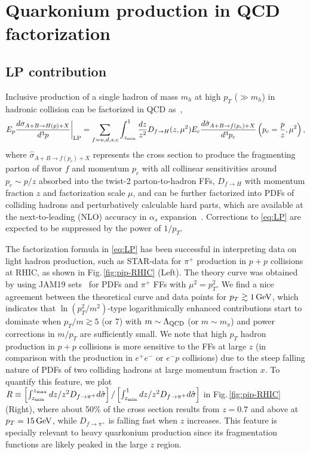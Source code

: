 \documentclass[Physsubmission, Phys]{SciPost}
\begin{document}
\section{Quarkonium production in QCD factorization}
\label{sec:qcd-factorization}


\subsection{LP contribution}
\label{subsec:LP}

Inclusive production of a single hadron of mass $m_h$ at high $p_T$ ($\gg m_h$) in hadronic collision can be factorized in QCD as~\cite{Nayak:2005rt},
\begin{align}
E_p\frac{d\sigma_{A+B\to H(p)+X}}{d^3p}\bigg|_{\rm LP}
= \sum_{f=u,d,s,c}\int_{z_{\rm min}}^1 \frac{dz}{z^2}D_{f\to H}(z,\mu^2)
E_c\frac{d\hat{\sigma}_{A+B\to f(p_c)+X}}{d^3p_c}\left(p_c=\frac{p}{z},\mu^2\right),
\label{eq:LP}
\end{align}
where $\hat{\sigma}_{A+B\to f(p_c)+X}$ represents the cross section to produce the fragmenting parton of flavor $f$ and momentum $p_c$ with all collinear sensitivities around $p_c\sim p/z$  absorbed into the twist-2 parton-to-hadron FFs, $D_{f\to H}$ with momentum fraction $z$ and factorization scale $\mu$, and can be further factorized into PDFs of colliding hadrons and perturbatively calculable hard parts, which are available at the next-to-leading (NLO) accuracy in $\alpha_s$ expansion~\cite{Aversa:1988vb}. Corrections to \eqref{eq:LP} are expected to be suppressed by the power of $1/p_T$.


The factorization formula in \eqref{eq:LP} has been successful in interpreting data on light hadron production, such as STAR-data for $\pi^+$ production in $p+p$ collisions at RHIC, as shown in Fig.\,\ref{fig:pip-RHIC} (Left). 
The theory curve was obtained by using JAM19 sets~\cite{Sato:2019yez} for PDFs and $\pi^+$ FFs with 
$\mu^2=p_T^2$.
We find a nice agreement between the theoretical curve and data points for $p_T\gtrsim 1\,{\rm GeV}$, which indicates that $\ln(p_T^2/m^2)$-type logarithmically enhanced contributions start to dominate when $p_T/m \gtrsim 5$ (or 7) with $m\sim \Lambda_{\rm QCD}$ (or $m\sim m_{\pi}$) and power corrections in $m/p_T$ are sufficiently small.  We note that
high $p_T$ hadron production in $p+p$ collisions is more sensitive to the FFs at large $z$ (in comparison with the production in $e^+ e^-$ or $e^- p$ collisions) due to the steep falling nature of PDFs of two colliding hadrons at large momentum fraction $x$. To quantify this feature, we plot 
$R\equiv \left[{\int_{z_{\rm min}}^{z_{\rm max}}dz/z^2 D_{f\to \pi^+}d\hat{\sigma}}\right]
/\left[{\int_{z_{\rm min}}^{1}dz/z^2 D_{f\to \pi^+}d\hat{\sigma}}\right]$ 
in Fig.\,\ref{fig:pip-RHIC} (Right), where about 50\% of the cross section results from $z=0.7$ and above at $p_T=15\,{\rm GeV}$, while $D_{f\to \pi^+}$ is falling fast when $z$ increases.  This feature is specially relevant to heavy quarkonium production since its fragmentation functions are likely peaked in the large $z$ region.  
\end{document}
